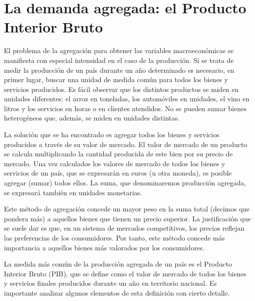 \documentclass[
]{krantz}
\begin{document}
\hypertarget{la-demanda-agregada-el-producto-interior-bruto}{%
\section{La demanda agregada: el Producto Interior Bruto}\label{la-demanda-agregada-el-producto-interior-bruto}}

El problema de la agregación para obtener las variables macroeconómicas se manifiesta con especial intensidad en el caso de la producción. Si se trata de medir la producción de un país durante un año determinado es necesario, en primer lugar, buscar una unidad de medida común para todos los bienes y servicios producidos. Es fácil observar que los distintos productos se miden en unidades diferentes: el arroz en toneladas, los automóviles en unidades, el vino en litros y los servicios en horas o en clientes atendidos. No se pueden sumar bienes heterogéneos que, además, se miden en unidades distintas.

La solución que se ha encontrado es agregar todos los bienes y servicios producidos a través de su valor de mercado. El valor de mercado de un producto se calcula multiplicando la cantidad producida de este bien por su precio de mercado. Una vez calculados los valores de mercado de todos los bienes y servicios de un país, que se expresarán en euros (u otra moneda), es posible agregar (sumar) todos ellos. La suma, que denominaremos producción agregada, se expresará también en unidades monetarias.

Este método de agregación concede un mayor peso en la suma total (decimos que pondera más) a aquellos bienes que tienen un precio superior. La justificación que se suele dar es que, en un sistema de mercados competitivos, los precios reflejan las preferencias de los consumidores. Por tanto, este método concede más importancia a aquellos bienes más valorados por los consumidores.

La medida más común de la producción agregada de un país es el Producto Interior Bruto (PIB), que se define como el valor de mercado de todos los bienes y servicios finales producidos durante un año en territorio nacional. Es importante analizar algunos elementos de esta definición con cierto detalle.
\end{document}
